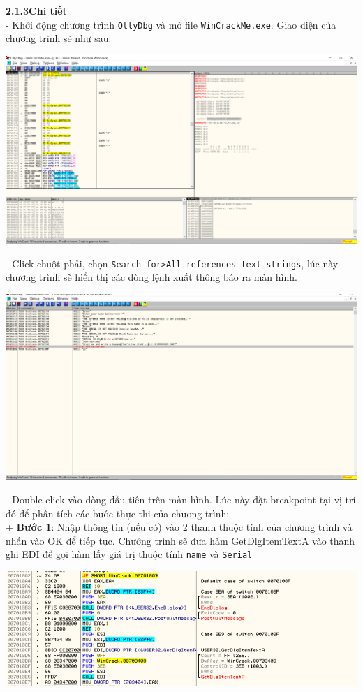 \noindent\textbf{2.1.3\quad Chi tiết}\\
- Khởi động chương trình \texttt{OllyDbg} và mở file \texttt{WinCrackMe.exe}. Giao diện của chương trình sẽ như sau: 
\begin{center}
    \includegraphics[width=\textwidth]{img/file-2/asm1.PNG}
\end{center}
- Click chuột phải, chọn \texttt{Search for>All references text strings}, lúc này chương trình sẽ hiển thị các dòng lệnh xuất thông báo ra màn hình.\\
\begin{center}
    \includegraphics[width=\textwidth]{img/file-2/asm2.PNG}
\end{center}
- Double-click vào dòng đầu tiên trên màn hình. Lúc này đặt breakpoint tại vị trí đó để phân tích các bước thực thi của chương trình:\\
+ \textbf{Bước 1}: Nhập thông tin (nếu có) vào 2 thanh thuộc tính của chương trình và nhấn vào OK để tiếp tục. Chưởng trình sẽ đưa hàm GetDlgItemTextA vào thanh ghi EDI để gọi hàm lấy giá trị thuộc tính \texttt{name} và \texttt{Serial}\\
\begin{center}
    \includegraphics[width=\textwidth]{img/file-2/asm3.PNG}
\end{center}
